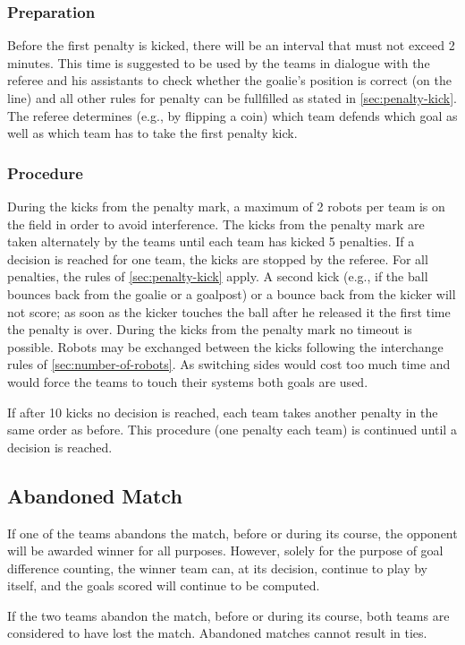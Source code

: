 \subsubsection{Preparation}
Before the first penalty is kicked, there will be an interval that must not exceed 2 minutes.
This time is suggested to be used by the teams in dialogue with the referee and his assistants to check whether the goalie's position is correct (on the line) and all other rules for penalty can be fullfilled as stated in \autoref{sec:penalty-kick}.
The referee determines (e.g., by flipping a coin) which team defends which goal as well as which team has to take the first penalty kick.

\subsubsection{Procedure}
During the kicks from the penalty mark, a maximum of 2 robots per team is on the field in order to avoid interference.
The kicks from the penalty mark are taken alternately by the teams until each team has kicked 5 penalties.
If a decision is reached for one team, the kicks are stopped by the referee.
For all penalties, the rules of \autoref{sec:penalty-kick} apply.
A second kick (e.g., if the ball bounces back from the goalie or a goalpost) or a bounce back from the kicker will not score; as soon as the kicker touches the ball after he released it the first time the penalty is over.
During the kicks from the penalty mark no timeout is possible.
Robots may be exchanged between the kicks following the interchange rules of \autoref{sec:number-of-robots}.
As switching sides would cost too much time and would force the teams to touch their systems both goals are used.

If after 10 kicks no decision is reached, each team takes another penalty in the same order as before.
This procedure (one penalty each team) is continued until a decision is reached.

\subsection{Abandoned Match}
If one of the teams abandons the match, before or during its course, the opponent will be awarded winner for all purposes.
However, solely for the purpose of goal difference counting, the winner team can, at its decision, continue to play by itself, and the goals scored will continue to be computed.

If the two teams abandon the match, before or during its course, both teams are considered to have lost the match.
Abandoned matches cannot result in ties.

